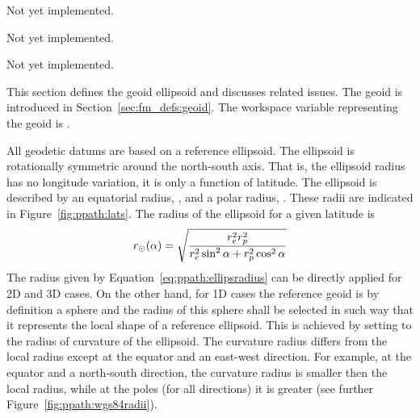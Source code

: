 Not yet implemented.


\label{sec:ppath:3Dwithout}

Not yet implemented.


\label{sec:ppath:3Dwith}

Not yet implemented.


\label{sec:ppath:geoids}

This section defines the geoid ellipsoid and discusses related
issues. The geoid is introduced in Section~\ref{sec:fm_defs:geoid}.
The workspace variable representing the geoid is .


\label{sec:ppath:geoid}

All geodetic datums are based on a reference ellipsoid. The ellipsoid is rotationally symmetric around the
north-south axis. That is, the ellipsoid radius has no longitude
variation, it is only a function of latitude. The ellipsoid is
described by an equatorial radius, , and a polar radius,
. These radii are indicated in Figure~\ref{fig:ppath:lats}.
The radius of the ellipsoid for a given latitude is
\begin{equation}
 r_{\odot}(\alpha) = \sqrt{\frac{r_{e}^2r_{p}^2}
                    {r_{e}^2\sin^2\alpha+r_{p}^2\cos^2\alpha}}
 \label{eq:ppath:ellipsradius} 
\end{equation}
The radius given by Equation~\ref{eq:ppath:ellipsradius} can be
directly applied for 2D and 3D cases. On the other hand, for 1D cases
the reference geoid is by definition a sphere and the radius of this
sphere shall be selected in such way that it represents the local
shape of a reference ellipsoid. This is achieved by setting
\aRds{\odot} to the radius of curvature of the ellipsoid. The
curvature radius differs from the local radius except at the equator
and an east-west direction. For example, at the equator and a
north-south direction, the curvature radius is smaller then the local
radius, while at the poles (for all directions) it is greater
(see further Figure~\ref{fig:ppath:wgs84radii}). 

